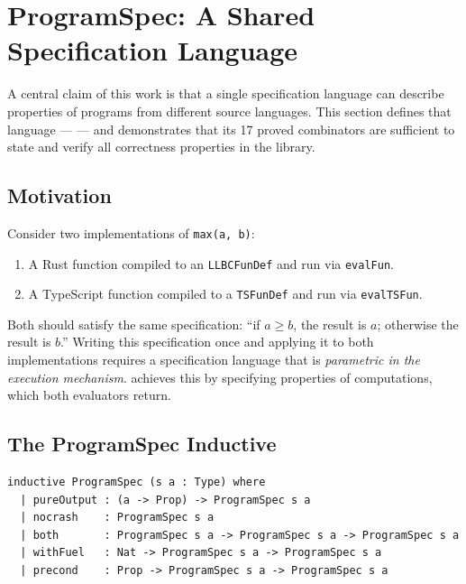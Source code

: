
\section{ProgramSpec: A Shared Specification Language}
\label{sec:programspec}

A central claim of this work is that a single specification language can
describe properties of programs from different source languages. This section
defines that language — \ProgramSpec — and demonstrates that its 17 proved
combinators are sufficient to state and verify all correctness properties in
the library.

\subsection{Motivation}

Consider two implementations of \texttt{max(a, b)}:
\begin{enumerate}[leftmargin=1.5em]
  \item A Rust function compiled to an \texttt{LLBCFunDef} and run via
        \texttt{evalFun}.
  \item A TypeScript function compiled to a \texttt{TSFunDef} and run via
        \texttt{evalTSFun}.
\end{enumerate}

Both should satisfy the same specification: ``if $a \ge b$, the result is
$a$; otherwise the result is $b$.'' Writing this specification once and
applying it to both implementations requires a specification language that
is \emph{parametric in the execution mechanism}. \ProgramSpec achieves this
by specifying properties of \RustM computations, which both evaluators return.

\subsection{The ProgramSpec Inductive}

\begin{lstlisting}[caption={ProgramSpec inductive type.},label={lst:progspec}]
inductive ProgramSpec (s a : Type) where
  | pureOutput : (a -> Prop) -> ProgramSpec s a
  | nocrash    : ProgramSpec s a
  | both       : ProgramSpec s a -> ProgramSpec s a -> ProgramSpec s a
  | withFuel   : Nat -> ProgramSpec s a -> ProgramSpec s a
  | precond    : Prop -> ProgramSpec s a -> ProgramSpec s a
\end{lstlisting}

